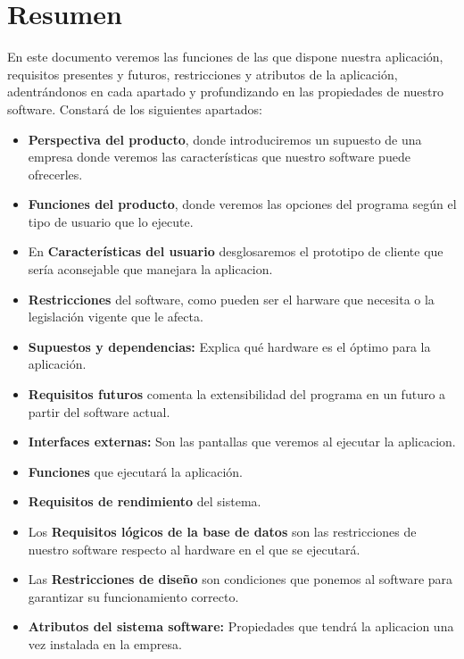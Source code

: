 \documentclass[spanish,a4paper,11pt, twoside]{report}	%
\begin{document}
\section{Resumen}

En este documento veremos las funciones de las que dispone nuestra aplicación, requisitos presentes y futuros, restricciones y atributos de la aplicación, adentrándonos en cada apartado y profundizando en las propiedades de nuestro software.
Constará de los siguientes apartados:
	\begin{itemize}
		\item \textbf{Perspectiva del producto}, donde introduciremos un supuesto de una empresa donde veremos las características que nuestro software puede ofrecerles.
		\item \textbf{Funciones del producto}, donde veremos las opciones del programa según el tipo de usuario que lo ejecute.
		\item En \textbf{Características del usuario} desglosaremos el prototipo de cliente que sería aconsejable que manejara la aplicacion.
		\item \textbf{Restricciones} del software, como pueden ser el harware que necesita o la legislación vigente que le afecta.
		\item \textbf{Supuestos y dependencias:} Explica qué hardware es el óptimo para la aplicación.
		\item \textbf{Requisitos futuros} comenta la extensibilidad del programa en un futuro a partir del software actual.
		\item \textbf{Interfaces externas:} Son las pantallas que veremos al ejecutar la aplicacion.
		\item \textbf{Funciones} que ejecutará la aplicación.
		\item \textbf{Requisitos de rendimiento} del sistema.
		\item Los \textbf{Requisitos lógicos de la base de datos} son las restricciones de nuestro software respecto al hardware en el que se ejecutará.
		\item Las \textbf{Restricciones de diseño} son condiciones que ponemos al software para garantizar su funcionamiento correcto.
		\item \textbf{Atributos del sistema software:} Propiedades que tendrá la aplicacion una vez instalada en la empresa.
	\end{itemize}


\setcounter{section}{0}

\end{document}
